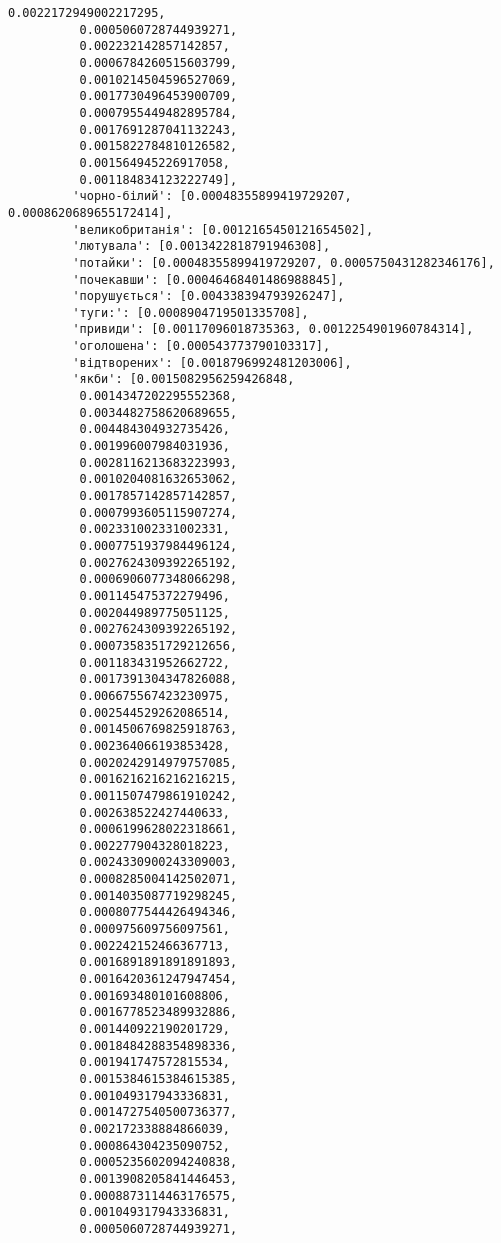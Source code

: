 \documentclass[11pt]{article}
\begin{document}
\begin{Verbatim}[commandchars=\\\{\}]
          0.0022172949002217295,
          0.0005060728744939271,
          0.002232142857142857,
          0.0006784260515603799,
          0.0010214504596527069,
          0.0017730496453900709,
          0.0007955449482895784,
          0.0017691287041132243,
          0.0015822784810126582,
          0.001564945226917058,
          0.001184834123222749],
         'чорно-білий': [0.00048355899419729207, 0.0008620689655172414],
         'великобританія': [0.0012165450121654502],
         'лютувала': [0.0013422818791946308],
         'потайки': [0.00048355899419729207, 0.0005750431282346176],
         'почекавши': [0.00046468401486988845],
         'порушується': [0.004338394793926247],
         'туги:': [0.0008904719501335708],
         'привиди': [0.00117096018735363, 0.0012254901960784314],
         'оголошена': [0.000543773790103317],
         'відтворених': [0.0018796992481203006],
         'якби': [0.0015082956259426848,
          0.0014347202295552368,
          0.0034482758620689655,
          0.004484304932735426,
          0.001996007984031936,
          0.0028116213683223993,
          0.0010204081632653062,
          0.0017857142857142857,
          0.0007993605115907274,
          0.002331002331002331,
          0.0007751937984496124,
          0.0027624309392265192,
          0.0006906077348066298,
          0.001145475372279496,
          0.002044989775051125,
          0.0027624309392265192,
          0.0007358351729212656,
          0.001183431952662722,
          0.0017391304347826088,
          0.006675567423230975,
          0.002544529262086514,
          0.0014506769825918763,
          0.002364066193853428,
          0.0020242914979757085,
          0.0016216216216216215,
          0.0011507479861910242,
          0.002638522427440633,
          0.0006199628022318661,
          0.002277904328018223,
          0.0024330900243309003,
          0.0008285004142502071,
          0.0014035087719298245,
          0.0008077544426494346,
          0.000975609756097561,
          0.002242152466367713,
          0.0016891891891891893,
          0.0016420361247947454,
          0.001693480101608806,
          0.0016778523489932886,
          0.001440922190201729,
          0.0018484288354898336,
          0.001941747572815534,
          0.0015384615384615385,
          0.001049317943336831,
          0.0014727540500736377,
          0.002172338884866039,
          0.000864304235090752,
          0.0005235602094240838,
          0.0013908205841446453,
          0.0008873114463176575,
          0.001049317943336831,
          0.0005060728744939271,

\end{Verbatim}
\end{document}
